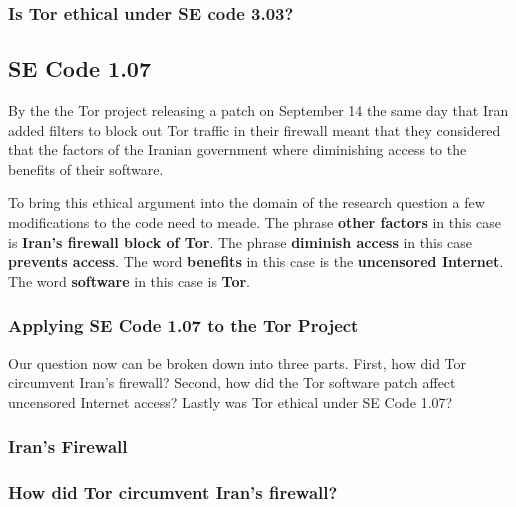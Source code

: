 \documentclass[11pt]{article}
\begin{document}
\begin{multicols}{2}
\subsubsection{Is Tor ethical under SE code 3.03?}


\subsection{SE Code 1.07} 

\newline

By the the Tor project releasing a patch on September 14 the same day that Iran
added filters to block out Tor traffic in their firewall meant that they
considered that the factors of the Iranian government where diminishing access
to the benefits of their software.

To bring this ethical argument into the domain of the research question a few
modifications to the code need to meade. The phrase \textbf{other factors} in
this case is \textbf{Iran's firewall block of Tor}. The phrase \textbf{diminish
access} in this case \textbf{prevents access}. The word \textbf{benefits} in
this case is the \textbf{uncensored Internet}. The word \textbf{software} in this
case is \textbf{Tor}.

\subsubsection{Applying SE Code 1.07 to the Tor Project}

\newline

Our question now can be broken down into three parts. First, how did Tor
circumvent Iran's firewall? Second, how did the Tor software patch affect
uncensored Internet access?  Lastly was Tor ethical under SE Code 1.07?

\subsubsection{Iran's Firewall}

\subsubsection{How did Tor circumvent Iran's firewall?}


\end{multicols}
\end{document}
